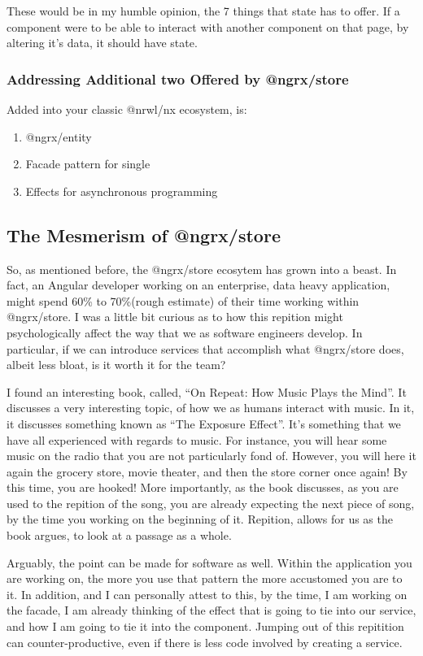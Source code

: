 These would be in my humble opinion, the 7 things that state has to offer. If a
component were to be able to interact with another component on that page, by
altering it's data, it should have state.

\subsubsection{ Addressing Additional two Offered by @ngrx/store }
Added into your classic @nrwl/nx ecosystem, is:
\begin{enumerate}
  \item @ngrx/entity
  \item Facade pattern for single
  \item Effects for asynchronous programming
\end{enumerate}

\subsection{The Mesmerism of @ngrx/store}

So, as mentioned before, the @ngrx/store ecosytem has grown into a beast. In
fact, an Angular developer working on an enterprise, data heavy application,
might spend 60\% to 70\%(rough estimate) of their time working within
@ngrx/store. I was a little bit curious as to how this repition might
psychologically affect the way that we as software engineers develop. In
particular, if we can introduce services that accomplish what @ngrx/store does,
albeit less bloat, is it worth it for the team?

I found an interesting book, called, ``On Repeat: How Music Plays the Mind''. It
discusses a very interesting topic, of how we as humans interact with music. In
it, it discusses something known as ``The Exposure Effect''. It's something that
we have all experienced with regards to music. For instance, you will hear some
music on the radio that you are not particularly fond of. However, you will here
it again the grocery store, movie theater, and then the store corner once again!
By this time, you are hooked! More importantly, as the book discusses, as you
are used to the repition of the song, you are already expecting the next piece
of song, by the time you working on the beginning of it. Repition, allows for us
as the book argues, to look at a passage as a whole.

Arguably, the point can be made for software as well. Within the application you
are working on, the more you use that pattern the more accustomed you are to it.
In addition, and I can personally attest to this, by the time, I am working on
the facade, I am already thinking of the effect that is going to tie into our
service, and how I am going to tie it into the component. Jumping out of this
repitition can counter-productive, even if there is less code involved by
creating a service. 

